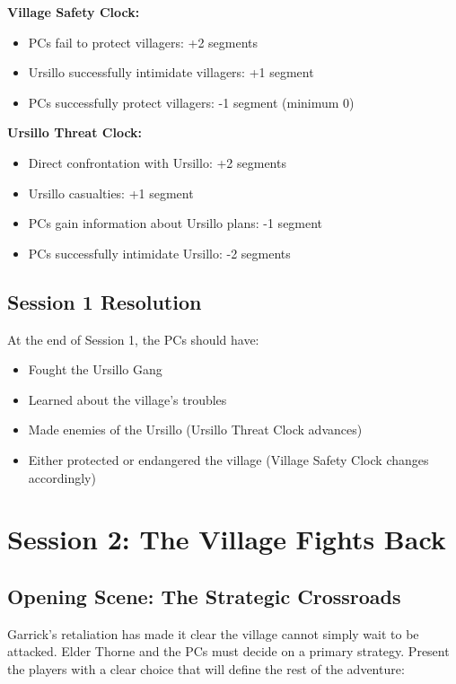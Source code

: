 \documentclass[11pt]{article}
\begin{document}
\textbf{Village Safety Clock:}
\begin{itemize}
\item PCs fail to protect villagers: +2 segments
\item Ursillo successfully intimidate villagers: +1 segment
\item PCs successfully protect villagers: -1 segment (minimum 0)
\end{itemize}

\textbf{Ursillo Threat Clock:}
\begin{itemize}
\item Direct confrontation with Ursillo: +2 segments
\item Ursillo casualties: +1 segment
\item PCs gain information about Ursillo plans: -1 segment
\item PCs successfully intimidate Ursillo: -2 segments
\end{itemize}

\subsection{Session 1 Resolution}

At the end of Session 1, the PCs should have:
\begin{itemize}
\item Fought the Ursillo Gang
\item Learned about the village's troubles
\item Made enemies of the Ursillo (Ursillo Threat Clock advances)
\item Either protected or endangered the village (Village Safety Clock changes accordingly)
\end{itemize}

\section{Session 2: The Village Fights Back}

\subsection{Opening Scene: The Strategic Crossroads}

Garrick's retaliation has made it clear the village cannot simply wait to be attacked. Elder Thorne and the PCs must decide on a primary strategy. Present the players with a clear choice that will define the rest of the adventure:
\end{document}
